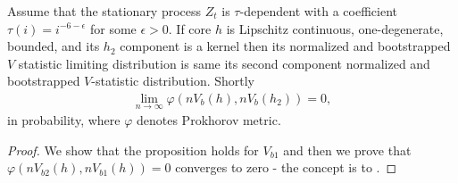 \begin{lemma}
\label{lem:equivBoot}
Assume that the stationary process $Z_t$ is $\tau$-dependent with a coefficient $\tau(i) = i^{-6-\epsilon}$ for some $\epsilon>0$. If core $h$ is Lipschitz continuous, one-degenerate, bounded, and its $h_2$ component is a kernel then its normalized and bootstrapped $V$ statistic limiting distribution is same its second component normalized and bootstrapped $V$-statistic distribution. Shortly
\begin{align}
\lim_{n \to \infty} \varphi( n V_b(h), nV_b(h_2)) =0, 
\end{align}
in probability, where $\varphi$ denotes Prokhorov metric. 
\end{lemma}
\begin{proof}
We show that the proposition holds for $V_{b1}$ and then we prove that $\varphi( n V_{b2}(h), nV_{b1}(h)) =0$ converges to zero - the concept is to \cite{leucht_dependent_2013}.   


\end{proof}
